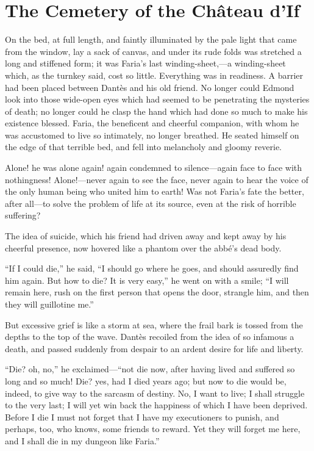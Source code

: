 \chapter{The Cemetery of the Château d’If}

On the bed, at full length, and faintly illuminated by the pale light
that came from the window, lay a sack of canvas, and under its rude
folds was stretched a long and stiffened form; it was Faria’s last
winding-sheet,—a winding-sheet which, as the turnkey said, cost so
little. Everything was in readiness. A barrier had been placed between
Dantès and his old friend. No longer could Edmond look into those
wide-open eyes which had seemed to be penetrating the mysteries of
death; no longer could he clasp the hand which had done so much to make
his existence blessed. Faria, the beneficent and cheerful companion,
with whom he was accustomed to live so intimately, no longer breathed.
He seated himself on the edge of that terrible bed, and fell into
melancholy and gloomy reverie.

Alone! he was alone again! again condemned to silence—again face to
face with nothingness! Alone!—never again to see the face, never again
to hear the voice of the only human being who united him to earth! Was
not Faria’s fate the better, after all—to solve the problem of life at
its source, even at the risk of horrible suffering?

The idea of suicide, which his friend had driven away and kept away by
his cheerful presence, now hovered like a phantom over the abbé’s dead
body.

“If I could die,” he said, “I should go where he goes, and should
assuredly find him again. But how to die? It is very easy,” he went on
with a smile; “I will remain here, rush on the first person that opens
the door, strangle him, and then they will guillotine me.”

But excessive grief is like a storm at sea, where the frail bark is
tossed from the depths to the top of the wave. Dantès recoiled from the
idea of so infamous a death, and passed suddenly from despair to an
ardent desire for life and liberty.

“Die? oh, no,” he exclaimed—“not die now, after having lived and
suffered so long and so much! Die? yes, had I died years ago; but now
to die would be, indeed, to give way to the sarcasm of destiny. No, I
want to live; I shall struggle to the very last; I will yet win back
the happiness of which I have been deprived. Before I die I must not
forget that I have my executioners to punish, and perhaps, too, who
knows, some friends to reward. Yet they will forget me here, and I
shall die in my dungeon like Faria.”

